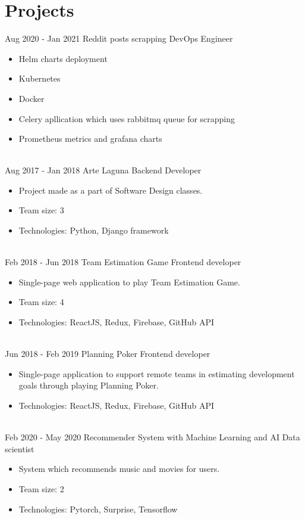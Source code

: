 \documentclass[letterpaper]{tenseconds} %
\begin{document}
\section{Projects}

\begin{twenty} %
	\twentyitem
	{Aug 2020 -}
	{Jan 2021}
	{Reddit posts scrapping \href{https://github.com/kk0walski/KubernetesScrapper}{\faGithub}}
	{DevOps Engineer}
	{}
	{\begin{itemize}
			\item Helm charts deployment
			\item Kubernetes
			\item Docker
			\item Celery apllication which uses rabbitmq queue for scrapping
			\item Prometheus metrics and grafana charts
		\end{itemize}}
	\\
	\twentyitem
	{Aug 2017 -}
	{Jan 2018}
	{Arte Laguna \href{https://github.com/kk0walski/konkurs}{\faGithub}}
	{Backend Developer}
	{}
	{\begin{itemize}
			\item Project made as a part of Software Design classes.
			\item Team size: 3
			\item Technologies: Python, Django framework
		\end{itemize}}
	\\
	\twentyitem
	{Feb 2018 -}
	{Jun 2018}
	{Team Estimation Game  \href{https://www.github.com/kk0walski/reactiveTeamEstimationGame}{\faGithub}}
	{Frontend developer}
	{}
	{\begin{itemize}
			\item Single-page web application to play Team Estimation Game.
			\item Team size: 4
			\item Technologies: ReactJS, Redux, Firebase, GitHub API
		\end{itemize}}
	\\
	\twentyitem
	{Jun 2018 -}
	{Feb 2019}
	{Planning Poker \href{https://github.com/kk0walski/PlanningPoker}{\faGithub}}
	{Frontend developer}
	{}
	{\begin{itemize}
			\item Single-page application to support remote teams in estimating development goals through playing Planning Poker.
			\item Technologies: ReactJS, Redux, Firebase, GitHub API
		\end{itemize}}
	\\
	\twentyitem
	{Feb 2020 -}
	{May 2020}
	{Recommender System with Machine Learning and AI \href{https://sundog-education.com/recsys/}{\faExternalLink}}
	{Data scientist}
	{}
	{\begin{itemize}
			\item System which recommends music and movies for users.
			\item Team size: 2
			\item Technologies: Pytorch, Surprise, Tensorflow
		\end{itemize}}
\end{twenty}
\end{document}
